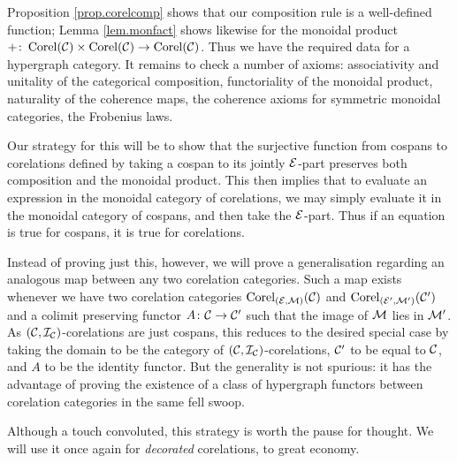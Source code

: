Proposition \ref{prop.corelcomp} shows that our composition rule is a
well-defined function; Lemma \ref{lem.monfact} shows likewise for the monoidal
product $+{\colon} \operatorname{{Corel}}(\mathcal C)\times \operatorname{{Corel}}(\mathcal C) \to \operatorname{{Corel}}(\mathcal C)$. Thus we
have the required data for a hypergraph category. It remains to check a
number of axioms: associativity and unitality of the categorical composition,
functoriality of the monoidal product, naturality of the coherence maps, the
coherence axioms for symmetric monoidal categories, the Frobenius laws.

Our strategy for this will be to show that the surjective function from cospans
to corelations defined by taking a cospan to its jointly $\mathcal E$-part preserves
both composition and the monoidal product. This then implies that to evaluate an
expression in the monoidal category of corelations, we may simply evaluate it in
the monoidal category of cospans, and then take the $\mathcal E$-part. Thus if an
equation is true for cospans, it is true for corelations.

Instead of proving just this, however, we will prove a generalisation regarding
an analogous map between any two corelation categories. Such a map exists
whenever we have two corelation categories $\operatorname{{Corel}}_{(\mathcal E,\mathcal M)}(\mathcal C)$ and
$\operatorname{{Corel}}_{(\mathcal E',\mathcal M')}(\mathcal C')$ and a colimit
preserving functor $A{\colon} \mathcal C \to \mathcal C'$ such that the image of $\mathcal M$ lies
in $\mathcal M'$. As $(\mathcal C,\mathcal I_{\mathcal C})$-corelations are just cospans, this
reduces to the desired special case by taking the domain to be the category of
$(\mathcal C,\mathcal I_{\mathcal C})$-corelations, $\mathcal C'$ to be equal to $\mathcal C$, and $A$ to
be the identity functor. But the generality is not spurious: it has the
advantage of proving the existence of a class of hypergraph functors between
corelation categories in the same fell swoop.

Although a touch convoluted, this strategy is worth the pause for thought. We
will use it once again for \emph{decorated} corelations, to great economy.

